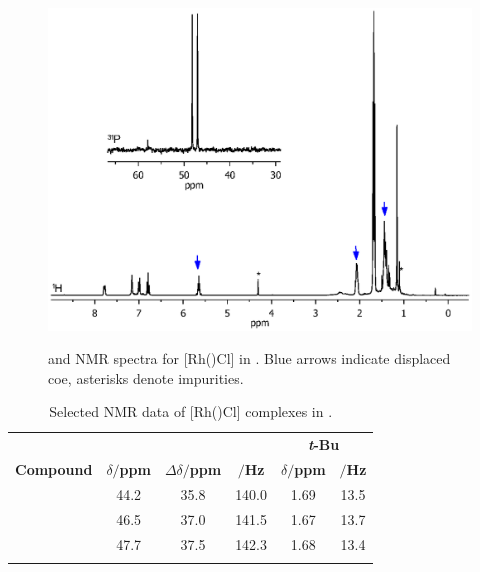 \begin{figure}[htbp]
\begin{center}
\vspace{0.5cm}
\includegraphics[trim = 2.5cm 4.0cm 2.5cm 15cm, clip]{../NMR/7004B.eps}
\caption[\phosphorus{} and \proton{} NMR spectra for [Rh(\tBuxantphos)Cl{]}]{\phosphorus{} and \proton{} NMR spectra for [Rh(\tBuxantphos)Cl] in .  Blue arrows indicate displaced \acrshort{coe}, asterisks denote impurities.}
\vspace{0.2cm}
\label{RhClnmr}
\end{center}
\end{figure}
\vspace{0.2cm}

\begin{table}[htbp]
\caption[Selected NMR data of [Rh(\tBuxantphos)Cl{]} complexes]{Selected NMR data of [Rh(\tBuxantphos)Cl] complexes in .}
\vspace{1em}
\label{table:rhodiumchloride}
\small
\begin{center}
\begin{tabular}{c c c c c c}
	\toprule{}
	~ & \multicolumn{3}{c}{\bfseries{\phosphorus}} & \multicolumn{2}{c}{\bfseries{\proton{} \emph{t}-Bu}}\\
	\cmidrule(lr){2-4} \cmidrule(lr){5-6} 
	\bfseries{Compound}&\bfseries{$\delta/$ppm}&\bfseries{$\Delta\delta/$ppm}&\bfseries{\JRhP{}$/$Hz}&\bfseries{$\delta/$ppm}&\bfseries{\J $/$Hz}\\
	\midrule{}
	\tBuSixantphos		&	44.2	&	35.8	&	140.0	& 1.69	& 13.5\\
	\tBuThixantphos	& 	46.5	&	37.0	&	141.5	& 1.67	& 13.7\\
	\tBuXantphos		&	47.7	&	37.5	&	142.3	& 1.68	& 13.4\\
	\bottomrule{}
\end{tabular}
\end{center}
\end{table}

